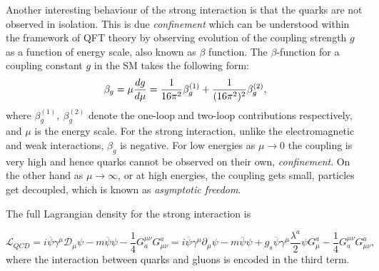 Another interesting behaviour of the strong interaction is that the quarks are not observed in isolation. This is due \textit{confinement} which can be understood within the framework of \gls{QFT} theory by observing evolution of the coupling strength $g$ as a function of energy scale, also known as $\beta$ function.
The $\beta$-function for a coupling constant $g$ in the \gls{SM} \DIFdelbegin {}\DIFdelend takes the following form:
\begin{equation}
\beta_g = \mu {{d g}\over d \mu} = {1\over16\pi^2} \beta_g^{(1)}
+ {1\over(16\pi^2)^2} \beta_g^{(2)},
\end{equation}
where $\beta_g^{(1)},~ \beta_g^{(2)}$ denote the one-loop and two-loop
contributions respectively, and $\mu$ is the energy scale. For the strong interaction, unlike the electromagnetic and weak interactions, $\beta_g$ is negative. For low energies as $\mu \rightarrow 0$ the coupling is very high and hence quarks cannot be observed on their own, \textit{confinement}. On the other hand as $\mu \rightarrow \infty$, or at high energies, the coupling gets small, particles get decoupled, which is known as \textit{asymptotic freedom}. 

The full Lagrangian density for the strong interaction is

\begin{equation}
	\mathcal{L}_{QCD} = i\overline{\psi}\gamma^{\mu}\mathcal{D}_{\mu}\psi - m\overline{\psi}\psi -\frac{1}{4} G_{a}^{\mu\nu}G^{a}_{\mu\nu} = i\overline{\psi}\gamma^{\mu}\partial_{\mu}\psi - m\overline{\psi}\psi + g_{s}\overline{\psi}\gamma^{\mu}\frac{\lambda^{a}}{2}\psi G^{a}_{\mu} -\frac{1}{4} G_{a}^{\mu\nu}G^{a}_{\mu\nu},
\label{eq:lag_fourth}
\end{equation}
where the interaction between quarks and gluons is encoded in the third term.


